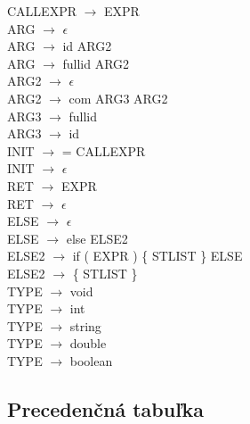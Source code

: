 \documentclass[11pt,a4paper]{article}
\begin{document}
CALLEXPR $\rightarrow$ EXPR \\
ARG $\rightarrow$ $\epsilon$ \\
ARG $\rightarrow$ id ARG2 \\
ARG $\rightarrow$ fullid ARG2 \\
ARG2 $\rightarrow$ $\epsilon$ \\
ARG2 $\rightarrow$ com ARG3 ARG2 \\
ARG3 $\rightarrow$ fullid \\
ARG3 $\rightarrow$ id \\
INIT $\rightarrow$ = CALLEXPR \\
INIT $\rightarrow$ $\epsilon$ \\
RET $\rightarrow$ EXPR \\
RET $\rightarrow$ $\epsilon$ \\
ELSE $\rightarrow$ $\epsilon$ \\
ELSE $\rightarrow$ else ELSE2 \\
ELSE2 $\rightarrow$ if ( EXPR ) \{ STLIST \} ELSE \\
ELSE2 $\rightarrow$ \{ STLIST \} \\
TYPE $\rightarrow$ void \\
TYPE $\rightarrow$ int \\
TYPE $\rightarrow$ string \\
TYPE $\rightarrow$ double \\
TYPE $\rightarrow$ boolean \\

\newpage
\subsection{Precedenčná tabuľka}
\label{tabulka}
\end{document}
